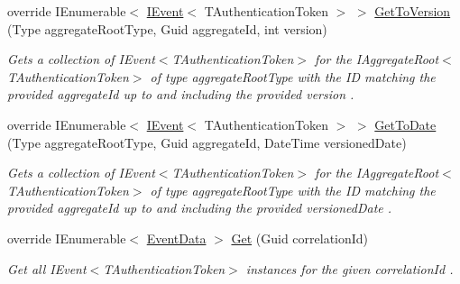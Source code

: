 \begin{DoxyCompactItemize}
override I\+Enumerable$<$ \hyperlink{interfaceCqrs_1_1Events_1_1IEvent}{I\+Event}$<$ T\+Authentication\+Token $>$ $>$ \hyperlink{classCqrs_1_1Azure_1_1BlobStorage_1_1Events_1_1TableStorageEventStore_ae6bd61257a3218d7ceb51a5ff54fb442_ae6bd61257a3218d7ceb51a5ff54fb442}{Get\+To\+Version} (Type aggregate\+Root\+Type, Guid aggregate\+Id, int version)
\begin{DoxyCompactList}\small\item\em Gets a collection of I\+Event$<$\+T\+Authentication\+Token$>$ for the I\+Aggregate\+Root$<$\+T\+Authentication\+Token$>$ of type {\itshape aggregate\+Root\+Type}  with the ID matching the provided {\itshape aggregate\+Id}  up to and including the provided {\itshape version} . \end{DoxyCompactList}\item 
override I\+Enumerable$<$ \hyperlink{interfaceCqrs_1_1Events_1_1IEvent}{I\+Event}$<$ T\+Authentication\+Token $>$ $>$ \hyperlink{classCqrs_1_1Azure_1_1BlobStorage_1_1Events_1_1TableStorageEventStore_a90fb91dfb58f69deb6f5e91bae69330d_a90fb91dfb58f69deb6f5e91bae69330d}{Get\+To\+Date} (Type aggregate\+Root\+Type, Guid aggregate\+Id, Date\+Time versioned\+Date)
\begin{DoxyCompactList}\small\item\em Gets a collection of I\+Event$<$\+T\+Authentication\+Token$>$ for the I\+Aggregate\+Root$<$\+T\+Authentication\+Token$>$ of type {\itshape aggregate\+Root\+Type}  with the ID matching the provided {\itshape aggregate\+Id}  up to and including the provided {\itshape versioned\+Date} . \end{DoxyCompactList}\item 
override I\+Enumerable$<$ \hyperlink{classCqrs_1_1Events_1_1EventData}{Event\+Data} $>$ \hyperlink{classCqrs_1_1Azure_1_1BlobStorage_1_1Events_1_1TableStorageEventStore_a9b952a9257dc6f458b98eba87684412e_a9b952a9257dc6f458b98eba87684412e}{Get} (Guid correlation\+Id)
\begin{DoxyCompactList}\small\item\em Get all I\+Event$<$\+T\+Authentication\+Token$>$ instances for the given {\itshape correlation\+Id} . \end{DoxyCompactList}\end{DoxyCompactItemize}
